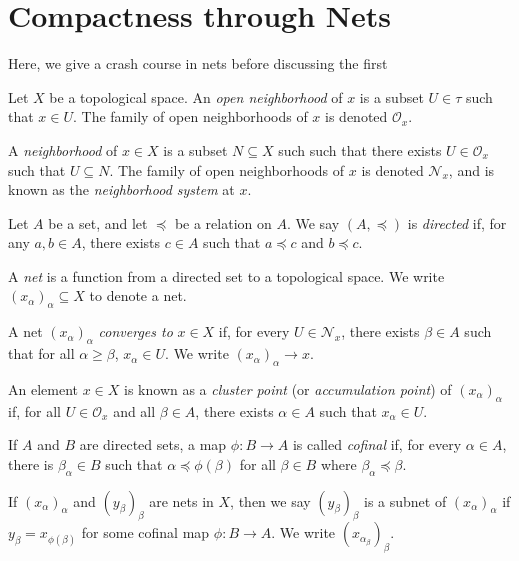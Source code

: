 \documentclass[11pt]{mypackage}
\begin{document}
\section{Compactness through Nets}%
Here, we give a crash course in nets before discussing the first 
\begin{definition}
  Let $X$ be a topological space. An \textit{open neighborhood} of $x$ is a subset $U\in \tau$ such that $x\in U$. The family of open neighborhoods of $x$ is denoted $\mathcal{O}_{x}$.\newline

  A \textit{neighborhood} of $x\in X$ is a subset $N\subseteq X$ such such that there exists $U\in \mathcal{O}_{x}$ such that $U\subseteq N$. The family of open neighborhoods of $x$ is denoted $\mathcal{N}_{x}$, and is known as the \textit{neighborhood system} at $x$.
\end{definition}
\begin{definition}
  Let $A$ be a set, and let $\preceq$ be a relation on $A$. We say $\left( A,\preceq \right)$ is \textit{directed} if, for any $a,b\in A$, there exists $c\in A$ such that $a\preceq c$ and $b\preceq c$.
\end{definition}
\begin{definition}
  A \textit{net} is a function from a directed set to a topological space. We write $\left( x_{\alpha} \right)_{\alpha}\subseteq X$ to denote a net.
\end{definition}
\begin{definition}
  A net $\left( x_{\alpha} \right)_{\alpha}$ \textit{converges to} $x\in X$ if, for every $U\in \mathcal{N}_{x}$, there exists $\beta\in A$ such that for all $\alpha \geq \beta$, $x_{\alpha}\in U$. We write $\left( x_{\alpha} \right)_{\alpha}\rightarrow x$.\newline

  An element $x\in X$ is known as a \textit{cluster point} (or \textit{accumulation point}) of $\left( x_{\alpha} \right)_{\alpha}$ if, for all $U\in \mathcal{O}_{x}$ and all $\beta\in A$, there exists $\alpha \in A$ such that $x_{\alpha}\in U$.
\end{definition}
\begin{definition}
  If $A$ and $B$ are directed sets, a map $\phi\colon B\rightarrow A$ is called \textit{cofinal} if, for every $\alpha \in A$, there is $\beta_{\alpha}\in B$ such that $\alpha\preceq \phi\left( \beta \right)$ for all $\beta\in B$ where $\beta_{\alpha}\preceq \beta$.\newline

  If $\left( x_{\alpha} \right)_{\alpha}$ and $\left( y_{\beta} \right)_{\beta}$ are nets in $X$, then we say $\left( y_{\beta} \right)_{\beta}$ is a subnet of $\left( x_{\alpha} \right)_{\alpha}$ if $y_{\beta} = x_{\phi\left( \beta \right)}$ for some cofinal map $\phi\colon B\rightarrow A$. We write $\left( x_{\alpha_{\beta}} \right)_{\beta}$.
\end{definition}
\end{document}
